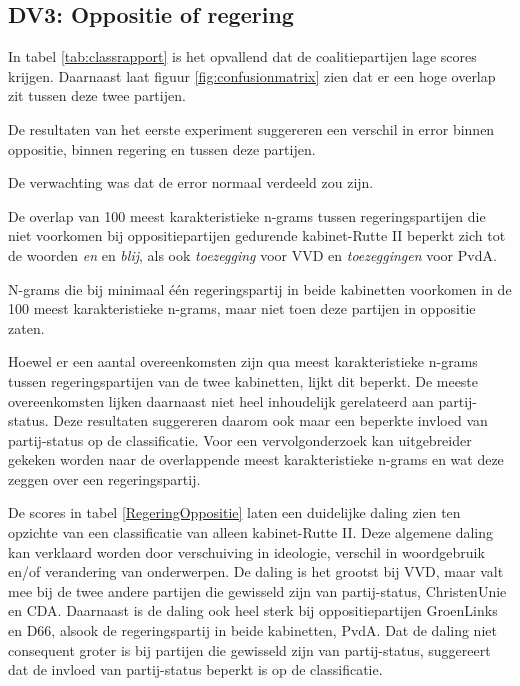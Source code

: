 \subsection{DV3: Oppositie of regering}
In tabel \ref{tab:classrapport} is het opvallend dat de coalitiepartijen lage scores krijgen. Daarnaast laat figuur \ref{fig:confusionmatrix} zien dat er een hoge overlap zit tussen deze twee partijen.\par
De resultaten van het eerste experiment suggereren een verschil in error binnen oppositie, binnen regering en tussen deze partijen.\par
De verwachting was dat de error normaal verdeeld zou zijn.\par
De overlap van 100 meest karakteristieke n-grams tussen regeringspartijen die niet voorkomen bij oppositiepartijen gedurende kabinet-Rutte II beperkt zich tot de woorden \textit{en} en \textit{blij}, als ook \textit{toezegging} voor VVD en \textit{toezeggingen} voor PvdA.\par
\begin{table}[H]
\label{tab:overlapkabinetten}
\caption{N-grams die bij minimaal één regeringspartij in beide kabinetten voorkomen in de 100 meest karakteristieke n-grams, maar niet toen deze partijen in oppositie zaten.}
\centering
 
\end{table}
Hoewel er een aantal overeenkomsten zijn qua meest karakteristieke n-grams tussen regeringspartijen van de twee kabinetten, lijkt dit beperkt. De meeste overeenkomsten lijken daarnaast niet heel inhoudelijk gerelateerd aan partij-status. Deze resultaten suggereren daarom ook maar een beperkte invloed van partij-status op de classificatie. Voor een vervolgonderzoek kan uitgebreider gekeken worden naar de overlappende meest karakteristieke n-grams en wat deze zeggen over een regeringspartij.\par
De scores in tabel \ref{RegeringOppositie} laten een duidelijke daling zien ten opzichte van een classificatie van alleen kabinet-Rutte II. Deze algemene daling kan verklaard worden door verschuiving in ideologie, verschil in woordgebruik en/of verandering van onderwerpen. De daling is het grootst bij VVD, maar valt mee bij de twee andere partijen die gewisseld zijn van partij-status, ChristenUnie en CDA. Daarnaast is de daling ook heel sterk bij oppositiepartijen GroenLinks en D66, alsook de regeringspartij in beide kabinetten, PvdA. Dat de daling niet consequent groter is bij partijen die gewisseld zijn van partij-status, suggereert dat de invloed van partij-status beperkt is op de classificatie.\par
